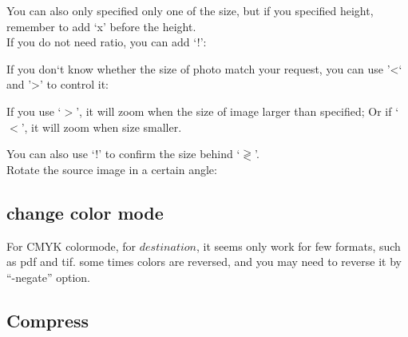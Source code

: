 \documentclass[12pt]{article}
\begin{document}
You can also only specified only one of the size, but if you specified height, remember to add `x' before the height.\\

If you do not need ratio, you can add `!':\vspace{5mm}

{\centering{}\par} \vspace{5mm}

If you don`t know whether the size of photo match your request, you can use '\textless` and '\textgreater' to control it:\vspace{5mm}

{\centering{}\par}\vspace{5mm}

If you use `$>$', it will zoom when the size of image larger than specified; Or if `$<$', it will zoom when size smaller.

You can also use `!' to confirm the size behind `$\gtrless$'.\\

Rotate the source image in a certain angle:\vspace{5mm}

{\centering{}\par}

\subsection{change color mode}

{\centering{}\par}\vspace{5mm}

For CMYK colormode, for $destination$, it seems only work for few formats, such as pdf and tif. some times colors are reversed, and you may need to reverse it by ``-negate'' option.

\subsection{Compress}
{\centering{}\par}\vspace{5mm}
\end{document}

